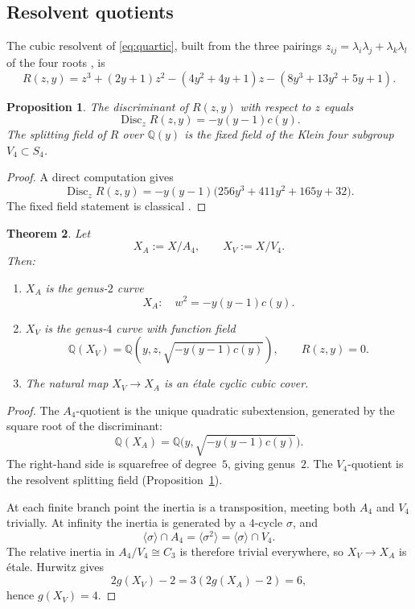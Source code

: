 \documentclass[11pt,letterpaper]{article}
\theoremstyle{plain}
\newtheorem{theorem}{Theorem}[section]
\newtheorem{proposition}[theorem]{Proposition}
\theoremstyle{remark}
\newcommand{\QQ}{\mathbb{Q}}
\newcommand{\Disc}{\operatorname{Disc}}
\begin{document}
\subsection{Resolvent quotients}

The cubic resolvent of \eqref{eq:quartic}, built from the three pairings \(z_{ij}=\lambda_i\lambda_j+\lambda_k\lambda_l\) of the four roots \cite{Cox2012}, is
\begin{equation}\label{eq:resolvent}
R(z,y)=z^3+(2y+1)z^2-(4y^2+4y+1)z-(8y^3+13y^2+5y+1).
\end{equation}

\begin{proposition}\label{prop:resolvent}
The discriminant of \(R(z,y)\) with respect to \(z\) equals
\[
\Disc_z R(z,y)=-y(y-1)c(y).
\]
The splitting field of \(R\) over \(\QQ(y)\) is the fixed field of the Klein four subgroup \(V_4\subset S_4\).
\end{proposition}

\begin{proof}
A direct computation gives
\[
\Disc_z R(z,y)=-y(y-1)\bigl(256y^3+411y^2+165y+32\bigr).
\]
The fixed field statement is classical \cite{Cox2012}.
\end{proof}

\begin{theorem}\label{thm:quotients}
Let
\[
X_A:=X/A_4,\qquad X_V:=X/V_4.
\]
Then:
\begin{enumerate}
\item[(i)] \(X_A\) is the genus-\(2\) curve
\[
X_A:\quad w^2=-y(y-1)c(y).
\]
\item[(ii)] \(X_V\) is the genus-\(4\) curve with function field
\[
\QQ(X_V)=\QQ(y,z,\sqrt{-y(y-1)c(y)}),\qquad R(z,y)=0.
\]
\item[(iii)] The natural map \(X_V\to X_A\) is an \'etale cyclic cubic cover.
\end{enumerate}
\end{theorem}

\begin{proof}
The \(A_4\)-quotient is the unique quadratic subextension, generated by the square root of the discriminant:
\[
\QQ(X_A)=\QQ\bigl(y,\sqrt{-y(y-1)c(y)}\bigr).
\]
The right-hand side is squarefree of degree~\(5\), giving genus~\(2\). The \(V_4\)-quotient is the resolvent splitting field (Proposition~\ref{prop:resolvent}).

At each finite branch point the inertia is a transposition, meeting both \(A_4\) and \(V_4\) trivially. At infinity the inertia is generated by a \(4\)-cycle \(\sigma\), and
\[
\langle \sigma\rangle\cap A_4=\langle \sigma^2\rangle=\langle \sigma\rangle\cap V_4.
\]
The relative inertia in \(A_4/V_4\cong C_3\) is therefore trivial everywhere, so \(X_V\to X_A\) is \'etale. Hurwitz gives
\[
2g(X_V)-2=3(2g(X_A)-2)=6,
\]
hence \(g(X_V)=4\).
\end{proof}
\end{document}

